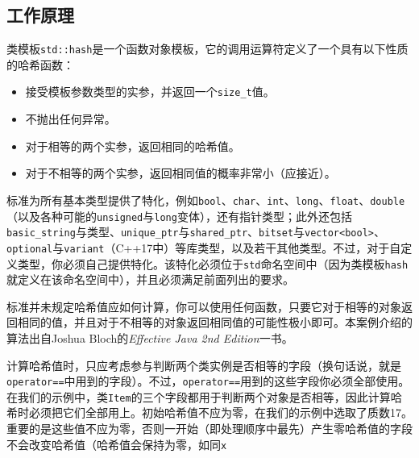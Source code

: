 \subsection{工作原理}



类模板\texttt{std::\allowbreak{}hash}是一个函数对象模板，它的调用运算符定义了一个具有以下性质的哈希函数：



\begin{itemize}
\item 接受模板参数类型的实参，并返回一个\texttt{size\_\allowbreak{}t}值。



\item 不抛出任何异常。



\item 对于相等的两个实参，返回相同的哈希值。



\item 对于不相等的两个实参，返回相同值的概率非常小（应接近）。

\end{itemize}



标准为所有基本类型提供了特化，例如\texttt{bool}、\texttt{char}、\texttt{int}、\texttt{long}、\texttt{float}、\texttt{double}（以及各种可能的\texttt{unsigned}与\texttt{long}变体），还有指针类型；此外还包括\texttt{basic\_\allowbreak{}string}与类型、\texttt{unique\_\allowbreak{}ptr}与\texttt{shared\_\allowbreak{}ptr}、\texttt{bitset}与\texttt{vector<\allowbreak{}bool>}、\texttt{optional}与\texttt{variant}（C++17中）等库类型，以及若干其他类型。不过，对于自定义类型，你必须自己提供特化。该特化必须位于\texttt{std}命名空间中（因为类模板\texttt{hash}就定义在该命名空间中），并且必须满足前面列出的要求。



标准并未规定哈希值应如何计算，你可以使用任何函数，只要它对于相等的对象返回相同的值，并且对于不相等的对象返回相同值的可能性极小即可。本案例介绍的算法出自Joshua Bloch的\textit{Effective Java 2nd Edition}一书。



计算哈希值时，只应考虑参与判断两个类实例是否相等的字段（换句话说，就是\texttt{operator==}中用到的字段）。不过，\texttt{operator==}用到的这些字段你必须全部使用。在我们的示例中，类\texttt{Item}的三个字段都用于判断两个对象是否相等，因此计算哈希时必须把它们全部用上。初始哈希值不应为零，在我们的示例中选取了质数17。重要的是这些值不应为零，否则一开始（即处理顺序中最先）产生零哈希值的字段不会改变哈希值（哈希值会保持为零，如同\texttt{x}


